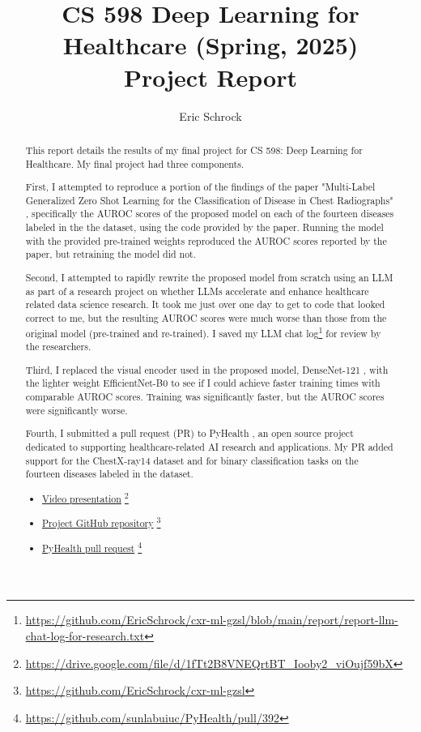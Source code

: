 \documentclass[letterpaper]{article} %
\title{CS 598 Deep Learning for Healthcare (Spring, 2025)\\Project Report}
\author {Eric Schrock}
\begin{document}
\maketitle

\begin{abstract}
This report details the results of my final project for CS 598: Deep Learning for Healthcare. My final project had three components.

First, I attempted to reproduce a portion of the findings of the paper "Multi-Label Generalized Zero Shot Learning for the Classification of Disease in Chest Radiographs" \cite{hayat2021multilabel}, specifically the AUROC scores of the proposed model on each of the fourteen diseases labeled in the the dataset, using the code provided by the paper. Running the model with the provided pre-trained weights reproduced the AUROC scores reported by the paper, but retraining the model did not.

Second, I attempted to rapidly rewrite the proposed model from scratch using an LLM as part of a research project on whether LLMs accelerate and enhance healthcare related data science research. It took me just over one day to get to code that looked correct to me, but the resulting AUROC scores were much worse than those from the original model (pre-trained and re-trained). I saved my LLM chat log\footnote{\url{https://github.com/EricSchrock/cxr-ml-gzsl/blob/main/report/report-llm-chat-log-for-research.txt}} for review by the researchers.

Third, I replaced the visual encoder used in the proposed model, DenseNet-121 \cite{huang2018denselyconnectedconvolutionalnetworks}, with the lighter weight EfficientNet-B0 \cite{tan2020efficientnetrethinkingmodelscaling} to see if I could achieve faster training times with comparable AUROC scores. Training was significantly faster, but the AUROC scores were significantly worse.

Fourth, I submitted a pull request (PR) to PyHealth \cite{pyhealth2023yang}, an open source project dedicated to supporting healthcare-related AI research and applications. My PR added support for the ChestX-ray14 \cite{Wang_2017} dataset and for binary classification tasks on the fourteen diseases labeled in the dataset.

\begin{itemize}
    \item \href{https://drive.google.com/file/d/1fTt2B8VNEQrtBT_Iooby2_viOujf59bX}{Video presentation} \footnote{\url{https://drive.google.com/file/d/1fTt2B8VNEQrtBT_Iooby2_viOujf59bX}}
    \item \href{https://github.com/EricSchrock/cxr-ml-gzsl}{Project GitHub repository} \footnote{\url{https://github.com/EricSchrock/cxr-ml-gzsl}}
    \item \href{https://github.com/sunlabuiuc/PyHealth/pull/392}{PyHealth pull request} \footnote{\url{https://github.com/sunlabuiuc/PyHealth/pull/392}}
\end{itemize}
\end{abstract}
\end{document}

